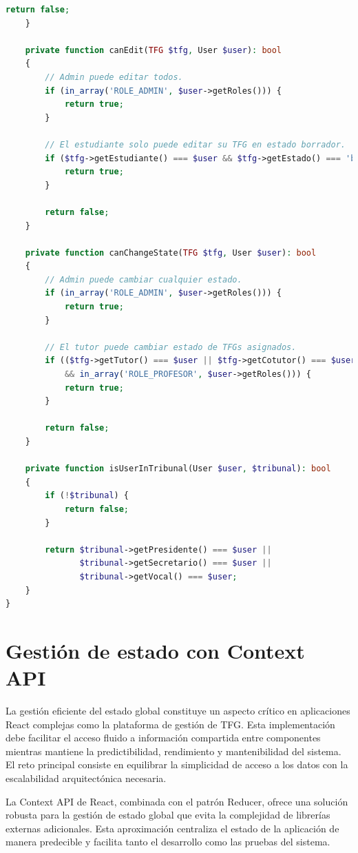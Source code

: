\documentclass[12pt,a4paper,oneside]{report}
\begin{document}
\begin{lstlisting}[language=PHP]
        return false;
    }

    private function canEdit(TFG $tfg, User $user): bool
    {
        // Admin puede editar todos.
        if (in_array('ROLE_ADMIN', $user->getRoles())) {
            return true;
        }

        // El estudiante solo puede editar su TFG en estado borrador.
        if ($tfg->getEstudiante() === $user && $tfg->getEstado() === 'borrador') {
            return true;
        }

        return false;
    }

    private function canChangeState(TFG $tfg, User $user): bool
    {
        // Admin puede cambiar cualquier estado.
        if (in_array('ROLE_ADMIN', $user->getRoles())) {
            return true;
        }

        // El tutor puede cambiar estado de TFGs asignados.
        if (($tfg->getTutor() === $user || $tfg->getCotutor() === $user) 
            && in_array('ROLE_PROFESOR', $user->getRoles())) {
            return true;
        }

        return false;
    }

    private function isUserInTribunal(User $user, $tribunal): bool
    {
        if (!$tribunal) {
            return false;
        }

        return $tribunal->getPresidente() === $user ||
               $tribunal->getSecretario() === $user ||
               $tribunal->getVocal() === $user;
    }
}
\end{lstlisting}

\section{Gestión de estado con Context
API}\label{gestiuxf3n-de-estado-con-context-api}

La gestión eficiente del estado global constituye un aspecto crítico en aplicaciones React complejas como la plataforma de gestión de TFG. Esta implementación debe facilitar el acceso fluido a información compartida entre componentes mientras mantiene la predictibilidad, rendimiento y mantenibilidad del sistema. El reto principal consiste en equilibrar la simplicidad de acceso a los datos con la escalabilidad arquitectónica necesaria.

La Context API de React, combinada con el patrón Reducer, ofrece una solución robusta para la gestión de estado global que evita la complejidad de librerías externas adicionales. Esta aproximación centraliza el estado de la aplicación de manera predecible y facilita tanto el
desarrollo como las pruebas del sistema.
\end{document}
